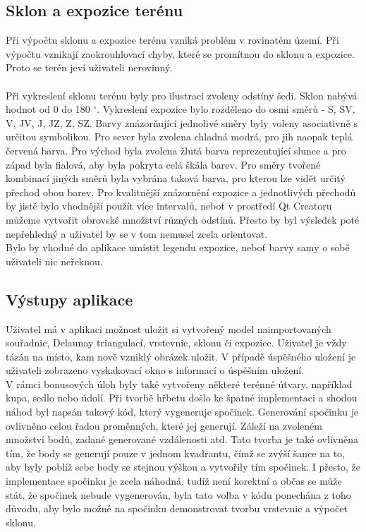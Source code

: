 \documentclass[a4paper, 12pt]{article}
\begin{document}
\subsection{Sklon a expozice terénu}
Při výpočtu sklonu a expozice terénu vzniká problém v rovinatém území. Při výpočtu vznikají zaokrouhlovací chyby, které se promítnou do sklonu a expozice. Proto se terén jeví uživateli nerovinný.\\
\\
Při vykreslení sklonu terénu byly pro ilustraci zvoleny odstíny šedi. Sklon nabývá hodnot od 0 do 180 $^\circ$. Vykreslení expozice bylo rozděleno do osmi směrů - S, SV, V, JV, J, JZ, Z, SZ. Barvy znázorňující jednolivé směry byly voleny asociativně s určitou symbolikou. Pro sever byla zvolena chladná modrá, pro jih naopak teplá červená barva. Pro východ byla zvolena žlutá barva reprezentující slunce a pro západ byla fialová, aby byla pokryta celá škála barev. Pro směry tvořené kombinací jiných směrů byla vybrána taková barva, pro kterou lze vidět určitý přechod obou barev. Pro kvalitnější znázornění expozice a jednotlivých přechodů by jistě bylo vhodnější použít více intervalů, neboť v prostředí Qt Creatoru můžeme vytvořit obrovské množství různých odstínů. Přesto by byl výsledek poté nepřehledný a uživatel by se v tom nemusel zcela orientovat. \\

Bylo by vhodné do aplikace umístit legendu expozice, neboť barvy samy o sobě uživateli nic neřeknou.

\subsection{Výstupy aplikace}
Uživatel má v aplikaci možnost uložit si vytvořený model naimportovaných souřadnic, Delaunay triangulací, vrstevnic, sklonu či expozice. Uživatel je vždy tázán na místo, kam nově vzniklý obrázek uložit. V případě úspěšného uložení je uživateli zobrazeno vyskakovací okno s informací o úspěšním uložení. \\

V rámci bonusových úloh byly také vytvořeny některé terénné útvary, například kupa, sedlo nebo údolí. Při tvorbě hřbetu došlo ke špatné implementaci a shodou náhod byl napsán takový kód, který vygeneruje spočinek. Generování spočinku je ovlivněno celou řadou proměnných, které jej generují. Záleží na zvoleném množství bodů, zadané generované vzdálenosti atd. Tato tvorba je také ovlivněna tím, že body se generují pouze v jednom kvadrantu, čímž se zvýší šance na to, aby byly poblíž sebe body se stejnou výškou a vytvořily tím spočinek. I přesto, že implementace spočinku je zcela náhodná, tudíž není korektní a občas se může stát, že spočinek nebude vygenerován, byla tato volba v kódu ponechána z toho důvodu, aby bylo možné na spočinku demonstrovat tvorbu vrstevnic a výpočet sklonu. \\ 
\end{document}
